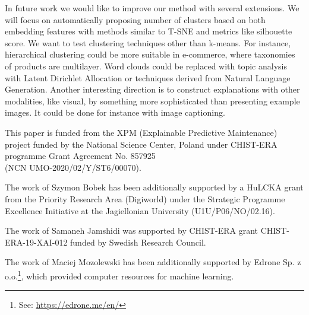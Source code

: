\documentclass[
 twocolumn,
 hf,
]{ceurart}
\begin{document}
In future work we would like to improve our method with several extensions.
We will focus on automatically proposing number of clusters based on both embedding features with methods similar to T-SNE and metrics like silhouette score.
We want to test clustering techniques other than k-means.
For instance, hierarchical clustering could be more suitable in e-commerce, where taxonomies of products are multilayer.
Word clouds could be replaced with topic analysis with Latent Dirichlet Allocation or techniques derived from Natural Language Generation.
Another interesting direction is to construct explanations with other modalities, like visual, by something more sophisticated than presenting example images.
It could be done for instance with image captioning.



\begin{acknowledgments}
  This paper is funded from the XPM (Explainable Predictive Maintenance) project funded by the National Science Center, Poland under CHIST-ERA programme Grant Agreement No. 857925 \\ (NCN UMO-2020/02/Y/ST6/00070).

  The work of Szymon Bobek has been additionally supported by a HuLCKA grant from the Priority Research Area (Digiworld) under the Strategic Programme Excellence Initiative at the Jagiellonian University (U1U/P06/NO/02.16).

  The work of Samaneh Jamshidi was supported by CHIST-ERA grant CHIST-ERA-19-XAI-012 funded by Swedish Research Council.

  The work of Maciej Mozolewski has been additionally supported by Edrone Sp. z o.o.\footnote{See: \url{https://edrone.me/en/}}, which provided computer resources for machine learning.
\end{acknowledgments}


\end{document}
